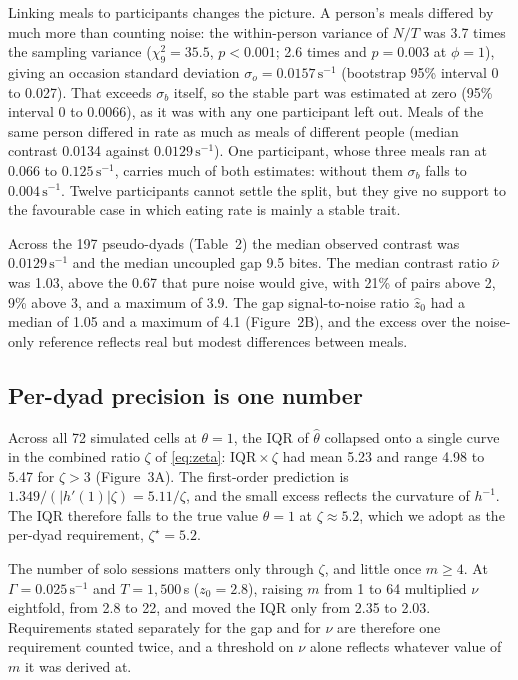 \documentclass[12pt]{article}
\begin{document}
Linking meals to participants changes the picture. A person's meals differed by
much more than counting noise: the within-person variance of $N/T$ was 3.7 times
the sampling variance ($\chi^2_9=35.5$, $p<0.001$; 2.6 times and $p=0.003$ at
$\phi=1$), giving an occasion standard deviation $\sigma_o=0.0157\,\mathrm{s}^{-1}$
(bootstrap 95\% interval 0 to 0.027). That exceeds $\sigma_b$ itself, so the stable
part was estimated at zero (95\% interval 0 to 0.0066), as it was with any one
participant left out. Meals of the same person differed in rate as much as meals
of different people (median contrast 0.0134 against $0.0129\,\mathrm{s}^{-1}$). One
participant, whose three meals ran at 0.066 to $0.125\,\mathrm{s}^{-1}$, carries
much of both estimates: without them $\sigma_b$ falls to $0.004\,\mathrm{s}^{-1}$.
Twelve participants cannot settle the split, but they give no support to the
favourable case in which eating rate is mainly a stable trait.

Across the 197 pseudo-dyads (Table~2) the median observed contrast was
$0.0129\,\mathrm{s}^{-1}$ and the median uncoupled gap 9.5 bites. The median
contrast ratio $\hat\nu$ was 1.03, above the 0.67 that pure noise would give, with
21\% of pairs above 2, 9\% above 3, and a maximum of 3.9. The
gap signal-to-noise ratio $\hat z_0$ had a median of 1.05 and a maximum of 4.1
(Figure~2B), and the excess over the noise-only reference reflects real but modest
differences between meals.

\subsection*{Per-dyad precision is one number}

Across all 72 simulated cells at $\theta=1$, the IQR of $\hat\theta$ collapsed onto
a single curve in the combined ratio $\zeta$ of \eqref{eq:zeta}: IQR\,$\times\,\zeta$
had mean 5.23 and range 4.98 to 5.47 for $\zeta>3$ (Figure~3A). The first-order
prediction is $1.349/(|h'(1)|\zeta)=5.11/\zeta$, and the small excess reflects the
curvature of $h^{-1}$. The IQR therefore falls to the true value $\theta=1$ at
$\zeta\approx5.2$, which we adopt as the per-dyad requirement, $\zeta^\star=5.2$.

The number of solo sessions matters only through $\zeta$, and little once
$m\geq4$. At $\Gamma=0.025\,\mathrm{s}^{-1}$ and $T=1{,}500$\,s ($z_0=2.8$),
raising $m$ from 1 to 64 multiplied $\nu$ eightfold, from 2.8 to 22, and moved the
IQR only from 2.35 to 2.03. Requirements stated separately for the gap and for
$\nu$ are therefore one requirement counted twice, and a threshold on $\nu$ alone
reflects whatever value of $m$ it was derived at.
\end{document}
